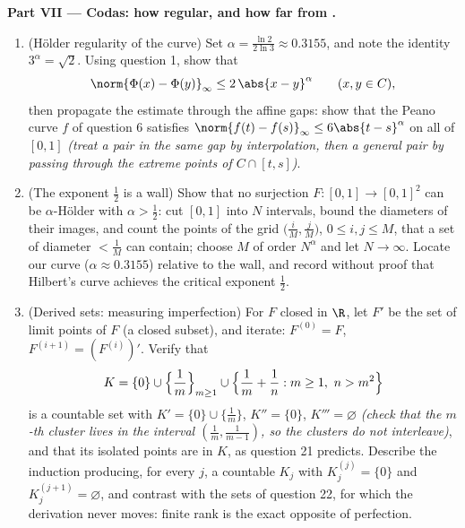 \begin{problem}
\medskip
\noindent\textbf{Part VII --- Codas: how regular, and how
far from .}
\begin{enumerate}[resume]
  \item (H\"older regularity of the curve) Set $\alpha =
        \frac{\ln 2}{2\ln 3} \approx 0.3155$, and note the
        identity $3^\alpha = \sqrt2$. Using question 1, show
        that
        \[
        \norm{\Phi(x) - \Phi(y)}_\infty \leq 2\,\abs{x -
        y}^\alpha \qquad (x, y \in C),
        \]
        then propagate the estimate through the affine gaps:
        show that the Peano curve $f$ of question 6 satisfies
        $\norm{f(t) - f(s)}_\infty \leq 6\abs{t - s}^\alpha$ on
        all of $[0,1]$ \emph{(treat a pair in the same gap by
        interpolation, then a general pair by passing through
        the extreme points of $C \cap [t, s]$)}.
  \item (The exponent $\frac12$ is a wall) Show that no
        surjection $F \colon [0,1] \to [0,1]^2$ can be
        $\alpha$-H\"older with $\alpha > \frac12$: cut $[0,1]$
        into $N$ intervals, bound the diameters of their
        images, and count the points of the grid
        $\bigl(\frac iM, \frac jM\bigr)$, $0 \leq i, j \leq M$,
        that a set of diameter $< \frac1M$ can contain; choose
        $M$ of order $N^\alpha$ and let $N \to \infty$. Locate
        our curve ($\alpha \approx 0.3155$) relative to the
        wall, and record without proof that Hilbert's curve
        achieves the critical exponent $\frac12$.
  \item (Derived sets: measuring imperfection) For $F$ closed
        in $\R$, let $F'$ be the set of limit points of $F$ (a
        closed subset), and iterate: $F^{(0)} = F$, $F^{(i+1)}
        = (F^{(i)})'$. Verify that
        \[
        K = \{0\} \cup \Bigl\{\frac1m\Bigr\}_{m \geq 1} \cup
        \Bigl\{\frac1m + \frac1n : m \geq 1,\ n > m^2\Bigr\}
        \]
        is a countable  set with $K' = \{0\} \cup
        \{\frac1m\}$, $K'' = \{0\}$, $K''' = \varnothing$
        \emph{(check that the $m$-th cluster lives in the
        interval $(\frac1m, \frac1{m-1})$, so the clusters do
        not interleave)}, and that its isolated points are
         in $K$, as question 21 predicts. Describe the
        induction producing, for every $j$, a countable 
        $K_j$ with $K_j^{(j)} = \{0\}$ and $K_j^{(j+1)} =
        \varnothing$, and contrast with the  sets of
        question 22, for which the derivation never moves:
        finite rank is the exact opposite of perfection.
\end{enumerate}
\end{problem}

